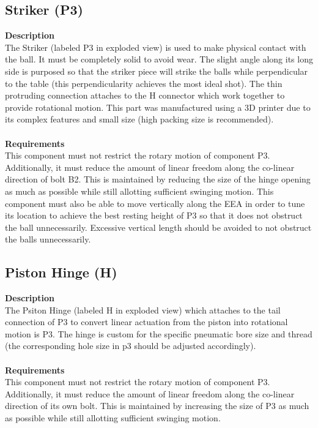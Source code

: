 \documentclass[titlepage]{article}
\begin{document}
\subsection{Striker (P3)}
\textbf{Description}\\
The Striker (labeled P3 in exploded view) is used to make physical contact with the ball. It must be completely solid to avoid wear. The slight angle along its long side is purposed so that the striker piece will strike the balls while perpendicular to the table (this perpendicularity achieves the most ideal shot). The thin protruding connection attaches to the H connector which work together to provide rotational motion. This part was manufactured using a 3D printer due to its complex features and small size (high packing size is recommended).\\~\\
\textbf{Requirements}\\
This component must not restrict the rotary motion of component P3. Additionally, it must reduce the amount of linear freedom along the co-linear direction of bolt B2. This is maintained by reducing the size of the hinge opening as much as possible while still allotting sufficient swinging motion. This component must also be able to move vertically along the EEA in order to tune its location to achieve the best resting height of P3 so that it does not obstruct the ball unnecessarily. Excessive vertical length should be avoided to not obstruct the balls unnecessarily.

\subsection{Piston Hinge (H)}
\textbf{Description}\\
The Psiton Hinge (labeled H in exploded view) which attaches to the tail connection of P3 to convert linear actuation from the piston into rotational motion is P3. The hinge is custom for the specific pneumatic bore size and thread (the corresponding hole size in p3 should be adjusted accordingly).\\~\\
\textbf{Requirements}\\
This component must not restrict the rotary motion of component P3. Additionally, it must reduce the amount of linear freedom along the co-linear direction of its own bolt. This is maintained by increasing the size of P3 as much as possible while still allotting sufficient swinging motion. 
\end{document}
